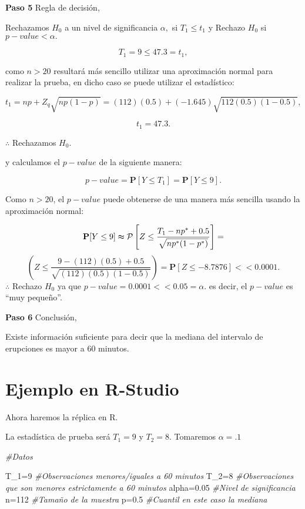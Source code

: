 \documentclass[
  a4paper,
  oneside,
  openany]{book}
\newenvironment{Shaded}{\begin{snugshade}}{\end{snugshade}}
\newcommand{\CommentTok}[1]{\textcolor[rgb]{0.56,0.35,0.01}{\textit{#1}}}
\newcommand{\DecValTok}[1]{\textcolor[rgb]{0.00,0.00,0.81}{#1}}
\newcommand{\FloatTok}[1]{\textcolor[rgb]{0.00,0.00,0.81}{#1}}
\newcommand{\NormalTok}[1]{#1}
\newcommand{\OtherTok}[1]{\textcolor[rgb]{0.56,0.35,0.01}{#1}}
\begin{document}
\textbf{Paso 5} Regla de decisión,

Rechazamos \(H_0\) a un nivel de significancia \(\alpha,\) si \(T_{1} \leq t_{1}\) y Rechazo \(H_0\) si \(p-value<\alpha.\)

\[T_{1}=9 \leq 47.3=t_{1},\]

como \(n>20\) resultará más sencillo utilizar una aproximación normal para realizar la prueba, en dicho caso se puede utilizar el estadístico:

\[t_{1}=np+Z_{q}\sqrt{np(1-p)}=(112)(0.5)+(-1.645)\sqrt{112(0.5)(1-0.5)},\]

\[t_{1}=47.3.\]

\(\therefore\) Rechazamos \(H_0.\)

y calculamos el \(p-value\) de la siguiente manera:

\[p-value= \mathbf{P}[Y\leq T_{1}]=\mathbf{P}[Y\leq 9].\]

Como \(n > 20\), el \(p-value\) puede obtenerse de una manera más sencilla usando la aproximación normal:

\[\mathbf{P}[Y\leq 9] \thickapprox \mathcal{P} \left[Z\leq\frac{T_{1}-np^*+0.5}{\sqrt{np^*(1-p^*)}}\right]=\]
\[\left(Z\leq\frac{9-(112)(0.5)+0.5}{\sqrt{(112)(0.5)(1-0.5)}}\right)=\mathbf{P}[Z\leq -8.7876] < < 0.0001.\]
\(\therefore\) Rechazo \(H_0\) ya que \(p-value=0.0001<<0.05=\alpha.\) es decir, el \(p-value\) es ``muy pequeño''.

\textbf{Paso 6} Conclusión,

Existe información suficiente para decir que la mediana del intervalo de erupciones es mayor a 60 minutos.

\hypertarget{ejemplo-en-r-studio-1}{%
\section{Ejemplo en R-Studio}\label{ejemplo-en-r-studio-1}}

Ahora haremos la réplica en R.

La estadística de prueba será \(T_1=9\) y \(T_2=8\). Tomaremos \(\alpha=.1\)

\begin{Shaded}
\begin{Highlighting}[]
\CommentTok{\#Datos}

\NormalTok{T\_1}\OtherTok{=}\DecValTok{9}         \CommentTok{\#Observaciones menores/iguales a 60 minutos}
\NormalTok{T\_2}\OtherTok{=}\DecValTok{8}         \CommentTok{\#Observaciones que son menores estrictamente a 60 minutos}
\NormalTok{alpha}\OtherTok{=}\FloatTok{0.05}    \CommentTok{\#Nivel de significancia}
\NormalTok{n}\OtherTok{=}\DecValTok{112}         \CommentTok{\#Tamaño de la muestra}
\NormalTok{p}\OtherTok{=}\FloatTok{0.5}         \CommentTok{\#Cuantil en este caso la mediana }
\end{Highlighting}
\end{Shaded}
\end{document}
